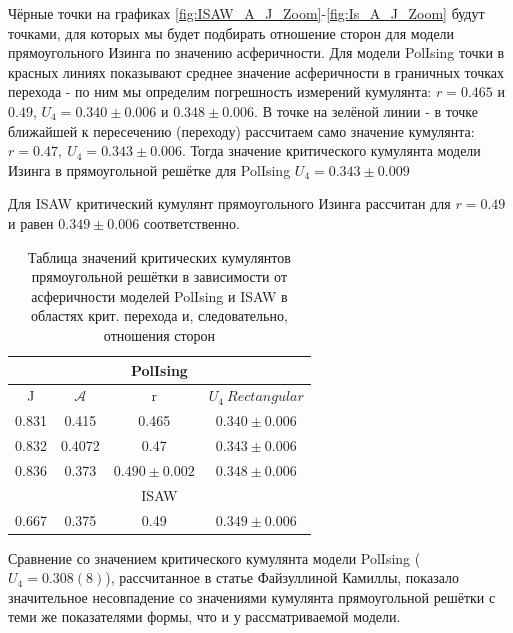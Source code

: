 \newpage

Чёрные точки на графиках \ref{fig:ISAW_A_J_Zoom}-\ref{fig:Is_A_J_Zoom} будут точками, для которых мы будет подбирать отношение сторон для модели прямоугольного Изинга по значению асферичности. Для модели PolIsing точки в красных линиях показывают среднее значение асферичности в граничных точках перехода - по ним мы определим погрешность измерений кумулянта: $r = 0.465$ и $0.49$, $U_{4} = 0.340\pm0.006$ и $0.348\pm0.006$. В точке на зелёной линии - в точке ближайшей к пересечению (переходу) рассчитаем само значение кумулянта: $r = 0.47,\ U_{4} = 0.343\pm0.006$. Тогда значение критического кумулянта модели Изинга в прямоугольной решётке для PolIsing $U_{4} = 0.343\pm0.009$

Для ISAW критический кумулянт прямоугольного Изинга рассчитан для $r=0.49$ и равен $0.349 \pm 0.006$ соответственно.

\begin{table}[h!]
    \centering
    \begin{tabular}{|c|c|c|c|}
        \hline
         \multicolumn{4}{|c|}{PolIsing}  \\ \hline
         J & $\mathcal{A}$ & r & $U_{4}\  Rectangular$ \\ \hline
         0.831 & 0.415 & 0.465 & $0.340 \pm 0.006$\\ \hline
         0.832 & 0.4072 & 0.47 & $0.343 \pm 0.006$\\ \hline
         0.836 & 0.373 & $0.490 \pm 0.002$ & $0.348 \pm 0.006$\\ \hline
         \multicolumn{4}{|c|}{ISAW} \\ \hline
         0.667 & 0.375 & 0.49 & $0.349 \pm 0.006$ \\ \hline
    \end{tabular}
    \caption{Таблица значений критических кумулянтов прямоугольной решётки в зависимости от асферичности моделей PolIsing и ISAW в областях крит. перехода и, следовательно, отношения сторон}
    \label{tab:my_label}
\end{table}

Сравнение со значением критического кумулянта модели PolIsing ($U_{4} = 0.308(8)$\cite{Kamilla}), рассчитанное в статье Файзуллиной Камиллы, показало значительное несовпадение со значениями кумулянта прямоугольной решётки с теми же показателями формы, что и у рассматриваемой модели. 